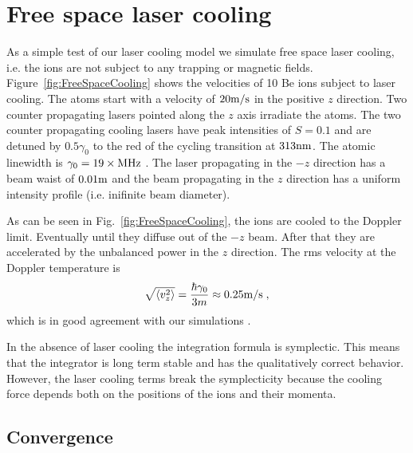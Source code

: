 \documentclass[aps, pra, preprint]{revtex4-1}
\begin{document}
\section{Free space laser cooling}

As a simple test of our laser cooling model we simulate free space laser
cooling, i.e. the ions are not subject to any trapping or magnetic
fields.  Figure~\ref{fig:FreeSpaceCooling} shows the velocities of 10 Be
ions subject to laser cooling.  The atoms start with a velocity of
$20{\rm m}/{\rm s}$ in the positive $z$ direction.  Two counter
propagating lasers pointed along the $z$ axis irradiate the atoms. The
two counter propagating cooling lasers have peak intensities of $S=0.1$
and are detuned by $0.5\gamma_0$ to the red of the cycling transition at
$313{\rm nm}$.  The atomic linewidth is $\gamma_0=19\times {\rm MHz}$ .
The laser propagating in the $-z$ direction has a beam waist of
$0.01{\rm m}$ and the beam propagating in the $z$ direction has a
uniform intensity profile (i.e. inifinite beam diameter).

As can be seen in Fig.~\ref{fig:FreeSpaceCooling}, the ions are cooled
to the Doppler limit.  Eventually until they diffuse out of the $-z$
beam.  After that they are accelerated by the unbalanced power in the
$z$ direction.  The rms velocity at the Doppler temperature is
\begin{equation}
\sqrt{\langle v_z^2\rangle} = \frac{\hbar \gamma_0}{3 m} \approx
0.25{\rm m}/{\rm s}\;,
\end{equation}
which is in good agreement with our simulations
.

In the absence of laser cooling the integration formula is
symplectic. This means that the integrator is long term stable
and has the qualitatively correct behavior. However, the laser
cooling terms break the symplecticity because the cooling force
depends both on the positions of the ions and their momenta.


\subsection{Convergence}
\end{document}
